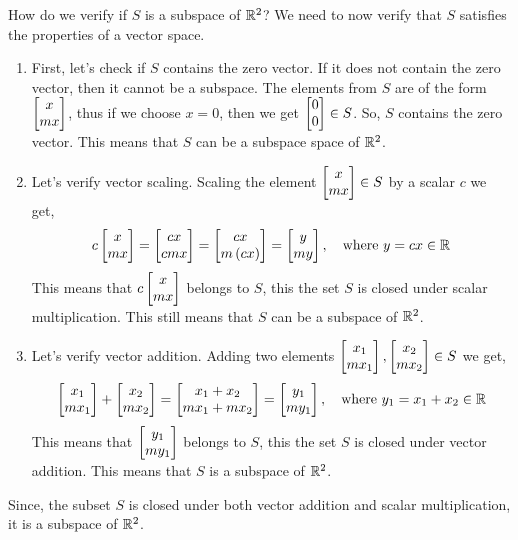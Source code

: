 \begin{example}
    \noindent How do we verify if $S$ is a subspace of $\mathbb{R}^2$? We need to now verify that $S$ satisfies the properties of a vector space.
    \begin{enumerate}
        \item First, let's check if $S$ contains the zero vector. If it does not contain the zero vector, then it cannot be a subspace. The elements from $S$ are of the form $\bmxc x \\ m x\emx$, thus if we choose $x = 0$, then we get $\bmx 0 \\ 0 \emx \in S$. So, $S$ contains the zero vector. This means that $S$ can be a subspace space of $\mathbb{R}^2$.
        \item Let's verify vector scaling. Scaling the element $\bmxc x \\ m x \emx \in S$ by a scalar $c$ we get,
        \[ c \bmxc x \\ m x\emx = \bmxc c x \\ c m x \emx = \bmxc c x \\ m \pp{c x} \emx = \bmxc y \\ m y\emx, \quad \text{where} \,\, y = c x \in \mb{R} \]
        This means that $c\bmxc x \\ m x\emx$ belongs to $S$, this the set $S$ is closed under scalar multiplication. This still means that $S$ can be a subspace of $\mathbb{R}^2$.
        \item Let's verify vector addition. Adding two elements $\bmxc x_1 \\ m x_1\emx, \bmxc x_2 \\ m x_2\emx \in S$ we get,
        \[ \bmxc x_1 \\ m x_1\emx + \bmxc x_2 \\ m x_2\emx = \bmxc x_1 + x_2 \\ m x_1 + m x_2 \emx = \bmxc y_1 \\ m y_1\emx, \quad \text{where} \,\, y_1 = x_1 + x_2 \in \mb{R} \]
        This means that $\bmxc y_1 \\ m y_1\emx$ belongs to $S$, this the set $S$ is closed under vector addition. This means that $S$ is a subspace of $\mathbb{R}^2$.
    \end{enumerate}
    Since, the subset $S$ is closed under both vector addition and scalar multiplication, it is a subspace of $\mathbb{R}^2$.
\end{example}


